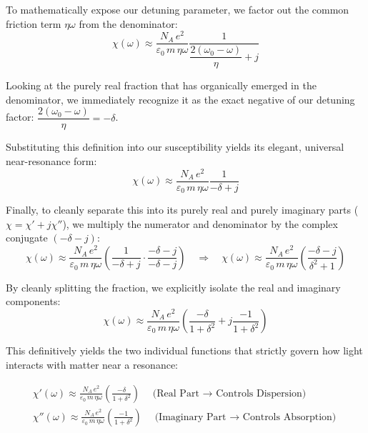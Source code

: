 To mathematically expose our detuning parameter, we factor out the common friction term $\eta\omega$ from the denominator:
\begin{equation*}
    \chi(\omega) \approx \frac{N_A\,e^2}{\varepsilon_0\,m\,\eta\omega} \frac{1}{\dfrac{2(\omega_0 - \omega)}{\eta} + j}
\end{equation*}

Looking at the purely real fraction that has organically emerged in the denominator, we immediately recognize it as the exact negative of our detuning factor: $\dfrac{2(\omega_0 - \omega)}{\eta} = -\delta$.

Substituting this definition into our susceptibility yields its elegant, universal near-resonance form:
\begin{equation*}
    \chi(\omega) \approx \frac{N_A\,e^2}{\varepsilon_0\,m\,\eta\omega} \frac{1}{-\delta + j}
\end{equation*}

Finally, to cleanly separate this into its purely real and purely imaginary parts ($\chi = \chi' + j\chi''$), we multiply the numerator and denominator by the complex conjugate $(-\delta - j)$:
\begin{equation*}
    \chi(\omega) \approx \frac{N_A\,e^2}{\varepsilon_0\,m\,\eta\omega} \left( \frac{1}{-\delta + j} \cdot \frac{-\delta - j}{-\delta - j} \right) \quad \Rightarrow \quad \chi(\omega) \approx \frac{N_A\,e^2}{\varepsilon_0\,m\,\eta\omega} \left( \frac{-\delta - j}{\delta^2 + 1} \right)
\end{equation*}

By cleanly splitting the fraction, we explicitly isolate the real and imaginary components:
\begin{equation*}
    \chi(\omega) \approx \frac{N_A\,e^2}{\varepsilon_0\,m\,\eta\omega} \left( \frac{-\delta}{1 + \delta^2} + j \frac{-1}{1 + \delta^2} \right)
\end{equation*}

This definitively yields the two individual functions that strictly govern how light interacts with matter near a resonance:
\begin{keyresult}
    \begin{gather}
        \chi'(\omega) \approx \frac{N_A\,e^2}{\varepsilon_0\,m\,\eta\omega}\left(\frac{-\delta}{1 + \delta^2}\right) \quad \text{(Real Part $\to$ Controls Dispersion)}\\[1ex]
        \chi''(\omega) \approx \frac{N_A\,e^2}{\varepsilon_0\,m\,\eta\omega}\left(\frac{-1}{1 + \delta^2}\right) \quad \text{(Imaginary Part $\to$ Controls Absorption)}
    \end{gather}
\end{keyresult}

